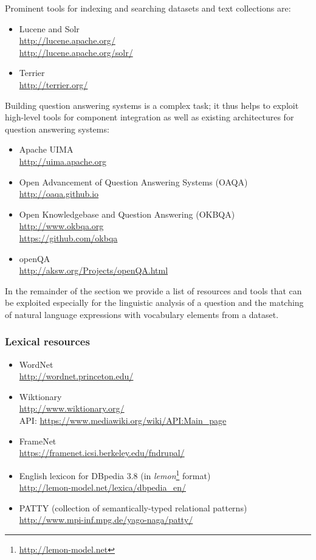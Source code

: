 
Prominent tools for indexing and searching datasets and text collections are:
\begin{itemize}
\item Lucene and Solr \\
      \url{http://lucene.apache.org/} \\
      \url{http://lucene.apache.org/solr/}
\item Terrier \\
      \url{http://terrier.org/} 
\end{itemize}

Building question answering systems is a complex task; it thus helps to exploit high-level tools for component integration as well as existing architectures for question answering systems: 
\begin{itemize}
\item Apache UIMA \\
\url{http://uima.apache.org}
\item Open Advancement of Question Answering Systems (OAQA) \\
\url{http://oaqa.github.io}
\item Open Knowledgebase and Question Answering (OKBQA) \\
\url{http://www.okbqa.org} \\
\url{https://github.com/okbqa}
\item openQA\\ 
\url{http://aksw.org/Projects/openQA.html}
\end{itemize}

In the remainder of the section we provide a list of resources and tools that can be exploited especially for the linguistic analysis of a question and the matching of natural language expressions with vocabulary elements from a dataset. 

\subsubsection*{Lexical resources}

\begin{itemize}
\item WordNet \\ 
      \url{http://wordnet.princeton.edu/}
\item Wiktionary \\
      \url{http://www.wiktionary.org/} \\
      API: \url{https://www.mediawiki.org/wiki/API:Main_page}
\item FrameNet \\
      \url{https://framenet.icsi.berkeley.edu/fndrupal/}            
\item English lexicon for DBpedia 3.8 (in \emph{lemon}\footnote{\url{http://lemon-model.net}} format) \\
      \url{http://lemon-model.net/lexica/dbpedia_en/} 
\item PATTY (collection of semantically-typed relational patterns) \\
      \url{http://www.mpi-inf.mpg.de/yago-naga/patty/}      
\end{itemize}

